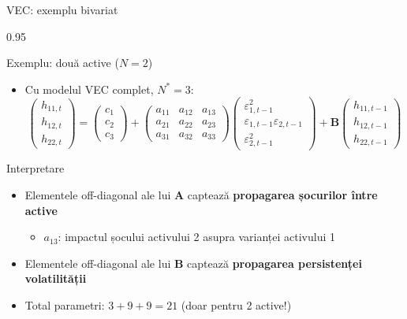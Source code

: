 \documentclass[9pt, aspectratio=169, t]{beamer}
\begin{document}
\begin{frame}{VEC: exemplu bivariat}
    \begin{cminipage}{0.95\textwidth}
    {\footnotesize
    \begin{exampleblock}{Exemplu: două active ($N=2$)}
        \begin{itemize}\setlength{\itemsep}{0pt}
            \item Cu modelul VEC complet, $N^* = 3$:
            \[
                \begin{pmatrix} h_{11,t} \\ h_{12,t} \\ h_{22,t} \end{pmatrix} = \begin{pmatrix} c_1 \\ c_2 \\ c_3 \end{pmatrix} + \begin{pmatrix} a_{11} & a_{12} & a_{13} \\ a_{21} & a_{22} & a_{23} \\ a_{31} & a_{32} & a_{33} \end{pmatrix} \begin{pmatrix} \varepsilon_{1,t-1}^2 \\ \varepsilon_{1,t-1}\varepsilon_{2,t-1} \\ \varepsilon_{2,t-1}^2 \end{pmatrix} + \mathbf{B} \begin{pmatrix} h_{11,t-1} \\ h_{12,t-1} \\ h_{22,t-1} \end{pmatrix}
            \]
        \end{itemize}
    \end{exampleblock}
    \begin{block}{Interpretare}
        \begin{itemize}\setlength{\itemsep}{0pt}
            \item Elementele off-diagonal ale lui $\mathbf{A}$ captează \textbf{propagarea șocurilor între active}
                \begin{itemize}\setlength{\itemsep}{0pt}
                    \item $a_{13}$: impactul șocului activului 2 asupra varianței activului 1
                \end{itemize}
            \item Elementele off-diagonal ale lui $\mathbf{B}$ captează \textbf{propagarea persistenței volatilității}
            \item Total parametri: $3 + 9 + 9 = 21$ (doar pentru 2 active!)
        \end{itemize}
    \end{block}
    }
    \end{cminipage}
\end{frame}
\end{document}
